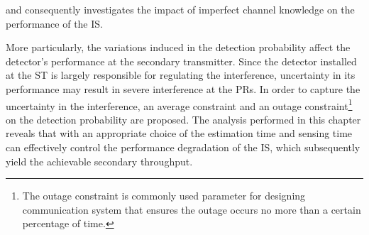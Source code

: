 and consequently investigates the impact of imperfect channel knowledge on the performance of the IS. 

More particularly, the variations induced in the detection probability affect the detector's performance at the secondary transmitter. Since the detector installed at the ST is largely responsible for regulating the interference, uncertainty in its performance may result in severe interference at the PRs. In order to capture the uncertainty in the interference, an average constraint and an outage constraint\footnote{The outage constraint is commonly used parameter for designing communication system that ensures the outage occurs no more than a certain percentage of time.} on the detection probability are proposed.
The analysis performed in this chapter reveals that with an appropriate choice of the estimation time and sensing time can effectively control the performance degradation of the IS, which subsequently yield the achievable secondary throughput.





